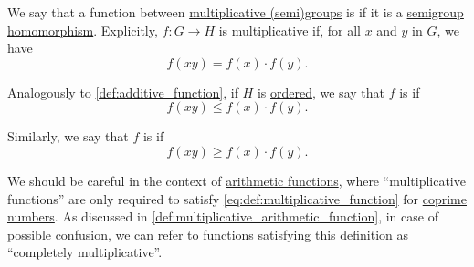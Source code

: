 \begin{definition}\label{def:multiplicative_function}\mimprovised
  We say that a function between \hyperref[def:additive_semigroup]{multiplicative (semi)groups} is  if it is a \hyperref[def:semigroup/morphism]{semigroup homomorphism}. Explicitly, \( f: G \to H \) is multiplicative if, for all \( x \) and \( y \) in \( G \), we have
  \begin{equation}\label{eq:def:multiplicative_function}
    f(xy) = f(x) \cdot f(y).
  \end{equation}

  \begin{thmenum}
     Analogously to \cref{def:additive_function}, if \( H \) is \hyperref[def:ordered_semigroup]{ordered}, we say that \( f \) is  if
    \begin{equation}\label{eq:def:multiplicative_function/sub}
      f(xy) \leq f(x) \cdot f(y).
    \end{equation}

     Similarly, we say that \( f \) is  if
    \begin{equation}\label{eq:def:multiplicative_function/super}
      f(xy) \geq f(x) \cdot f(y).
    \end{equation}
  \end{thmenum}
\end{definition}
\begin{comments}
  \item We should be careful in the context of \hyperref[def:arithmetic_function]{arithmetic functions}, where \enquote{multiplicative functions} are only required to satisfy \eqref{eq:def:multiplicative_function} for \hyperref[def:coprime_numbers]{coprime numbers}. As discussed in \cref{def:multiplicative_arithmetic_function}, in case of possible confusion, we can refer to functions satisfying this definition as \enquote{completely multiplicative}.
\end{comments}

